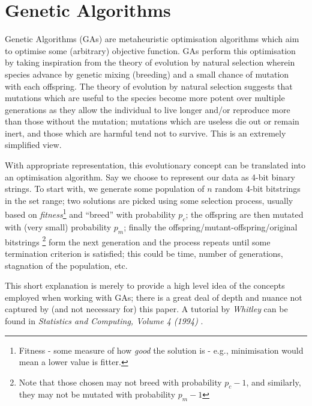 \documentclass[a4paper,11pt,twoside,openright]{article}
\let\oldsection\section
\def\section{\cleardoublepage\oldsection}
\begin{document}






\appendix
\section{Genetic Algorithms} \label{ap:ga}
Genetic Algorithms (GAs) are metaheuristic
optimisation algorithms which aim to optimise some (arbitrary) objective
function. GAs perform this optimisation by taking inspiration from the
theory of evolution by natural selection wherein species advance by genetic
mixing (breeding) and a small chance of mutation with each offspring.
The theory of evolution by natural selection suggests that mutations
which are useful to the species become more potent over multiple generations
as they allow the individual to live longer and/or reproduce more than those
without the mutation; mutations which are useless die out or remain inert, and
those which are harmful tend not to survive. This is an extremely simplified
view.
\newline
\par

With appropriate representation, this evolutionary concept can be
translated into an optimisation algorithm. Say we choose to represent our data as
4-bit binary strings. To start with, we generate some population of $n$ random
4-bit bitstrings in the set range; two solutions are picked using some selection
process, usually based on \textit{fitness}\footnote{Fitness - some measure of how
  \textit{good} the solution is - e.g., minimisation would mean a lower value is
  fitter.} and ``breed'' with probability $p_c$; the offspring are then mutated
with (very small) probability $p_m$; finally the
offspring/mutant-offspring/original bitstrings \footnote{Note that those chosen
  may not breed with probability $p_c - 1$, and
similarly, they may not be mutated with probability $p_m - 1$} form the next
generation and the process repeats until some termination criterion is satisfied;
this could be time, number of generations, stagnation of the population, etc.
\newline
\par

This short explanation is merely to provide a high level idea of the concepts
employed when working with GAs; there is a great deal of depth and nuance
not captured by (and not necessary for) this paper. A tutorial by
\textit{Whitley} can be found in \textit{Statistics and Computing, Volume 4
  (1994)} \cite{Whitley1994}. 
\end{document}
